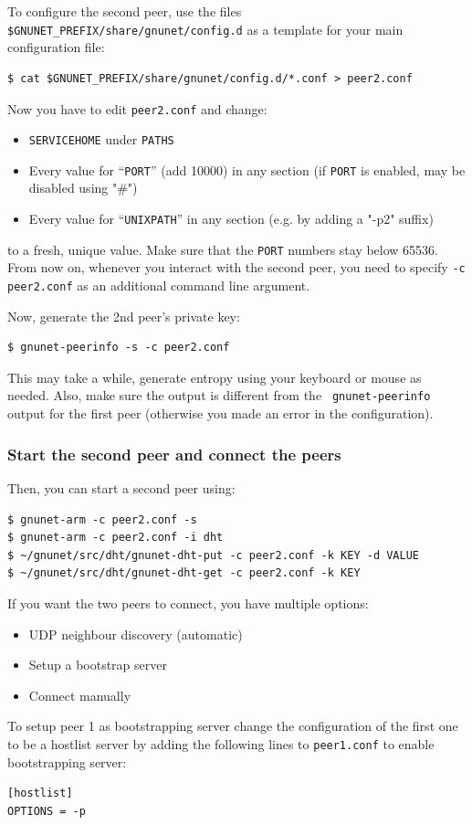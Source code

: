 \documentclass[10pt]{article}
\begin{document}
To configure the second peer, use the files {\tt
  \$GNUNET\_PREFIX/share/gnunet/config.d} as a template for your main
configuration file:
%
\lstset{language=bash}
\begin{lstlisting}
$ cat $GNUNET_PREFIX/share/gnunet/config.d/*.conf > peer2.conf
\end{lstlisting}
Now you have to edit {\tt peer2.conf} and change:
\begin{itemize}
  \itemsep0em
  \item{\texttt{SERVICEHOME} under \texttt{PATHS}}
  \item{Every value for ``\texttt{PORT}'' (add 10000) in any section (if \texttt{PORT} is enabled, may be disabled using "\#") }
  \item{Every value for ``\texttt{UNIXPATH}'' in any section (e.g. by adding a "-p2" suffix)}
\end{itemize}
to a fresh, unique value.  Make sure that the \texttt{PORT} numbers stay
below 65536.  From now on, whenever you interact with the second
peer, you need to specify {\tt -c peer2.conf} as an additional
command line argument.

Now, generate the 2nd peer's private key:

\lstset{language=bash}
\begin{lstlisting}
$ gnunet-peerinfo -s -c peer2.conf
\end{lstlisting}

This may take a while, generate entropy using your keyboard or mouse
as needed.  Also, make sure the output is different from the {\tt
  gnunet-peerinfo} output for the first peer (otherwise you made an
error in the configuration).

\subsubsection{Start the second peer and connect the peers}
Then, you can start a second peer using:
\lstset{language=bash}
\begin{lstlisting}
$ gnunet-arm -c peer2.conf -s
$ gnunet-arm -c peer2.conf -i dht
$ ~/gnunet/src/dht/gnunet-dht-put -c peer2.conf -k KEY -d VALUE
$ ~/gnunet/src/dht/gnunet-dht-get -c peer2.conf -k KEY
\end{lstlisting}
If you want the two peers to connect, you have multiple options:
\begin{itemize}
\itemsep0em
  \item UDP neighbour discovery (automatic)
  \item Setup a bootstrap server
  \item Connect manually
\end{itemize}
To setup peer 1 as bootstrapping server change the configuration of the first one to be a hostlist server by adding the following lines to \texttt{peer1.conf} to enable bootstrapping server:
 \begin{lstlisting}
[hostlist]
OPTIONS = -p
\end{lstlisting}
\end{document}
